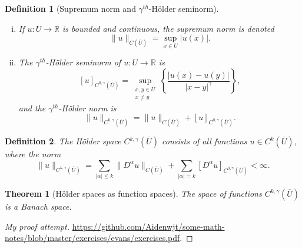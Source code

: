 \documentclass[11pt]{article}
\newtheorem{theorem}{Theorem}
\newtheorem{definition}{Definition}
\theoremstyle{definition}
\begin{document}
\begin{definition}[Supremum norm and $\gamma^{th}$-H\"{o}lder seminorm]~ 
\begin{enumerate}[(i)]
\item If $u : U \rightarrow \mathbb{R}$ is bounded and continuous, the supremum norm is denoted
\[\|u\|_{C(\overline{U})} = \sup_{x \in U}{|u(x)|}.\]

\item The $\gamma^{th}$-H\"{o}lder seminorm of $u : U \rightarrow \mathbb{R}$ is
\[[u]_{C^{0,\gamma}(\overline{U})} = \sup_{\substack{x,y\in U \\ x\not= y}}\left\{\frac{|u(x) - u(y)|}{|x-y|^{\gamma}}\right\},\]
and the $\gamma^{th}$-H\"{o}lder norm is
\[\|u\|_{C^{0,\gamma}(\overline{U})} = \|u\|_{C(\overline{U})} + [u]_{C^{0,\gamma}(\overline{U})}.\]
\end{enumerate}
\end{definition}

\begin{definition}
The H\"{o}lder space $C^{k,\gamma}(\overline{U})$ consists of all functions $u \in C^k(\overline{U})$,
where the norm
\[\|u\|_{C^{k,\gamma}(\overline{U})} = \sum_{|\alpha| \leq k}\|D^{\alpha}u\|_{C(\overline{U})} + \sum_{|\alpha| = k}[D^{\alpha}u]_{C^{0,\gamma}(\overline{U})} < \infty.\]
\end{definition}

\begin{theorem}[H\"{o}lder spaces as function spaces]
The space of functions $C^{k,\gamma}(\overline{U})$ is a Banach space.
\end{theorem}
\begin{proof}[My proof attempt]
\url{https://github.com/Aidenwjt/some-math-notes/blob/master/exercises/evans/exercises.pdf}.
\end{proof}

\newpage
\end{document}
